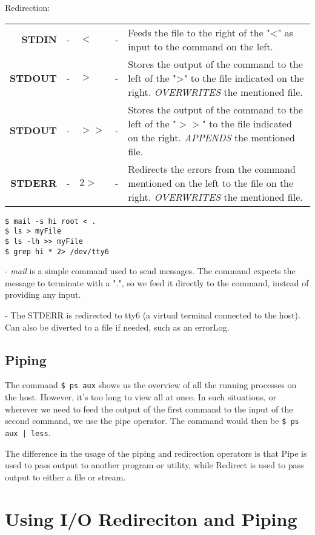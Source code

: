 \noindent
Redirection:

\noindent
\begin{tabular}{rclcp{}}
	\textbf{STDIN} &- &$<$ &- &Feeds the file to the right of the "<" as input to the command on the left. \\
	\textbf{STDOUT} &- &$>$ &- &Stores the output of the command to the left of the ">" to the file indicated on the right. \textit{OVERWRITES} the mentioned file.\\
	\textbf{STDOUT} &- &$>>$ &- &Stores the output of the command to the left of the "$>>$" to the file indicated on the right. \textit{APPENDS} the mentioned file.\\
	\textbf{STDERR} &- &$2>$ &- &Redirects the errors from the command mentioned on the left to the file on the right. \textit{OVERWRITES} the mentioned file.\\
\end{tabular}

\noindent
\begin{verbatim}
$ mail -s hi root < .
$ ls > myFile
$ ls -lh >> myFile
$ grep hi * 2> /dev/tty6
\end{verbatim}

 - \textit{mail} is a simple command used to send messages. The command expects the message to terminate with a ".", so we feed it directly to the command, instead of providing any input.

 - The STDERR is redirected to tty6 (a virtual terminal connected to the host). Can also be diverted to a file if needed, such as an errorLog.

\subsection{Piping}
The command \verb|$ ps aux| shows us the overview of all the running processes on the host. However, it's too long to view all at once. In such situations, or wherever we need to feed the output of the first command to the input of the second command, we use the pipe operator. The command would then be \verb=$ ps aux | less=.

The difference in the usage of the piping and redirection operators is that Pipe is used to pass output to another program or utility, while Redirect is used to pass output to either a file or stream.

\section{Using I/O Redireciton and Piping}


